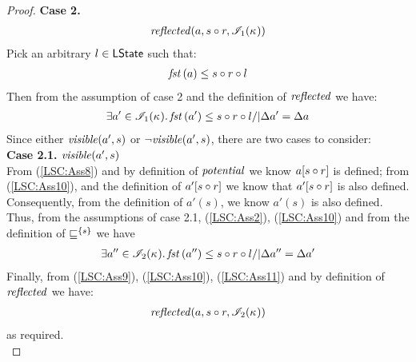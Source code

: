 \begin{lemma}
\begin{proof}
%
%
%
%
\noindent\textbf{Case 2.} 
%
\[
\begin{array}{l}
		\mathit{reflected}(a, s \circ r, \mathscr{I}_1(\kappa_{})) 
\end{array}
\]
Pick an arbitrary $l \in \textsf{LState}$ such that:
%
\begin{align}
	\mathit{fst}\left(a\right) \leq s \circ r \circ l \label{LSC:Ass9}
\end{align}
%
Then from the assumption of case 2 and the definition of $\mathit{reflected}$ we have:
\begin{align}
	\exists a' \in \mathscr{I}_1(\kappa_{}).\, \mathit{fst}\left(a'\right) \leq s \circ r \circ l /| \Delta {a'} = \Delta {a} \label{LSC:Ass10}
\end{align}
Since either $\mathit{visible}(a', s)$ or $\neg\mathit{visible}(a', s)$, there are two cases to consider:\\
%
\textbf{Case 2.1.} $\mathit{visible}(a', s)$ \\
From (\ref{LSC:Ass8}) and by definition of $\mathit{potential}$ we know $a[s \circ r]$ is defined; from (\ref{LSC:Ass10}), and the definition of $a'[s \circ r]$ we know that $a'[s \circ r]$ is also defined. Consequently, from the definition of $a'(s)$, we know $a'(s)$ is also defined. Thus, from the assumptions of case 2.1, (\ref{LSC:Ass2}), (\ref{LSC:Ass10}) and from the definition of $\sqsubseteq^{\{s\}}$ we have 
%
\begin{align}
	\exists a'' \in \mathscr{I}_2(\kappa_{}).\, \mathit{fst}\left(a''\right) \leq s \circ r \circ l /| \Delta {a''} = \Delta {a'} \label{LSC:Ass11}
\end{align} 
%
Finally, from (\ref{LSC:Ass9}), (\ref{LSC:Ass10}), (\ref{LSC:Ass11}) and by definition of $\mathit{reflected}$ we have:
%
\begin{align*}
	\mathit{reflected}(a, s \circ r, \mathscr{I}_2(\kappa_{}))
\end{align*} 
%
as required.\\


\end{proof}
\end{lemma}

